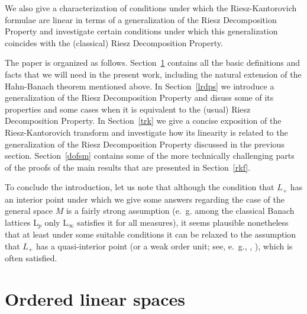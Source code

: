\documentclass [a4paper, 12pt] {amsart}
\newcommand {\lclassg} [1] {\ensuremath{\mathrm L_{#1}}}
\begin{document}
We also give a characterization of conditions under which the Riesz-Kantorovich formulae are linear in terms of a
generalization of the Riesz Decomposition Property and investigate certain conditions under which this generalization
coincides with the (classical) Riesz Decomposition Property.

The paper is organized as follows.
Section~\ref {ovl} contains all the basic definitions and facts that we will need in the present work,
including the natural extension of the Hahn-Banach theorem mentioned above.
In Section~\ref {lrdps} we introduce a generalization of the Riesz Decomposition Property
and disuss some of its properties and some cases when it is equivalent to the (usual) Riesz Decomposition Property.
In Section~\ref {trk} we give a concise exposition of the Riesz-Kantorovich transform and investigate how its linearity is related to the
generalization of the Riesz Decomposition Property discussed in the previous section.
Section~\ref {dofsm} contains some of the more technically challenging parts of the proofs of the main results
that are presented in Section~\ref {rkf}.

To conclude the introduction,
let us note that although the condition that $L_+$ has an interior point
under which we give some answers regarding the case of the
general space $M$ is a fairly strong assumption (e.~g. among the classical Banach lattices $\lclassg {p}$ only
$\lclassg {\infty}$ satisfies it for all measures),
it seems plausible nonetheless that at least under some suitable conditions it can be relaxed to the assumption
that $L_+$ has a quasi-interior point (or a weak order unit; see, e.~g., \cite {borweinlewis1992}, \cite [Theorem 4.85] {positiveoperators1985}),
which is often satisfied.




\section {Ordered linear spaces}

\label {ovl}
\end{document}
